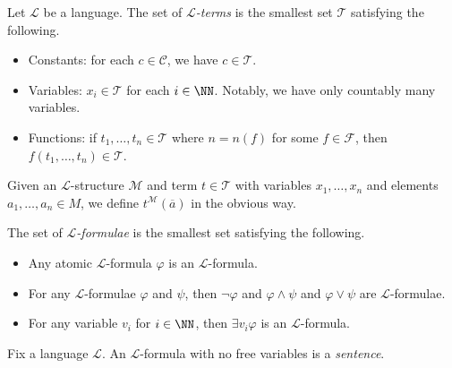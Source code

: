 \documentclass{article}
\begin{document}
\begin{definition}[term]
	Let $\mathcal L$ be a language. The set of \textit{$\mathcal L$-terms} is the smallest set $\mathcal T$ satisfying the following.
	\begin{itemize}
		\item Constants: for each $c\in\mathcal C$, we have $c\in\mathcal T$.
		\item Variables: $x_i\in\mathcal T$ for each $i\in\NN$. Notably, we have only countably many variables.
		\item Functions: if $t_1,\ldots,t_n\in\mathcal T$ where $n=n(f)$ for some $f\in\mathcal F$, then $f(t_1,\ldots,t_n)\in\mathcal T$.
	\end{itemize}
	Given an $\mathcal L$-structure $\mathcal M$ and term $t\in\mathcal T$ with variables $x_1,\ldots,x_n$ and elements $a_1,\ldots,a_n\in M$, we define $t^\mathcal M(\overline a)$ in the obvious way.
\end{definition}
\begin{definition}[formula]
	The set of \textit{$\mathcal L$-formulae} is the smallest set satisfying the following.
	\begin{itemize}
		\item Any atomic $\mathcal L$-formula $\varphi$ is an $\mathcal L$-formula.
		\item For any $\mathcal L$-formulae $\varphi$ and $\psi$, then $\lnot\varphi$ and $\varphi\land\psi$ and $\varphi\lor\psi$ are $\mathcal L$-formulae.
		\item For any variable $v_i$ for $i\in\NN$, then $\exists v_i\varphi$ is an $\mathcal L$-formula.
	\end{itemize}
\end{definition}
\begin{definition}[sentence]
	Fix a language $\mathcal L$. An $\mathcal L$-formula with no free variables is a \textit{sentence}.
\end{definition}
\end{document}
